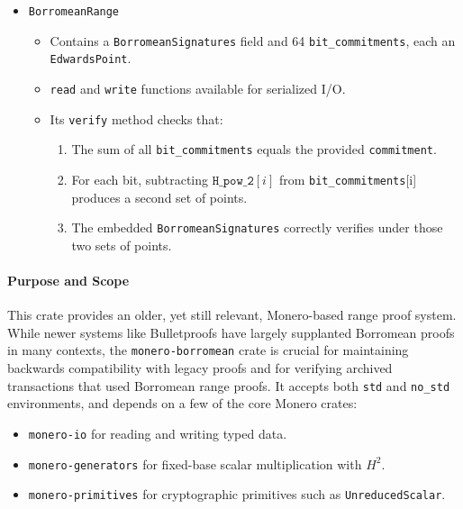 \documentclass[12pt,a4paper]{article}
\begin{document}
\begin{itemize}
  \item \texttt{BorromeanRange} %
  \begin{itemize}
    \item Contains a \texttt{BorromeanSignatures} field and 64 \texttt{bit\_commitments}, each an \texttt{EdwardsPoint}.
    \item \texttt{read} and \texttt{write} functions available for serialized I/O. %
    \item Its \texttt{verify} method checks that: %
      \begin{enumerate}[label=(\alph*)]
        \item The sum of all \texttt{bit\_commitments} equals the provided \texttt{commitment}. %
        \item For each bit, subtracting \(\texttt{H\_pow\_2}[i]\) from \texttt{bit\_commitments}[i] produces a second set of points. %
        \item The embedded \texttt{BorromeanSignatures} correctly verifies under those two sets of points. %
      \end{enumerate}
  \end{itemize}
\end{itemize}

\paragraph{Purpose and Scope}
This crate provides an older, yet still relevant, Monero-based range proof system.  While newer systems like Bulletproofs have largely supplanted Borromean proofs in many contexts, the \texttt{monero-borromean} crate is crucial for maintaining backwards compatibility with legacy proofs and for verifying archived transactions that used Borromean range proofs. It accepts both \texttt{std} and \texttt{no\_std} environments, and depends on a few of the core Monero crates:
\begin{itemize}
  \item \texttt{monero-io} for reading and writing typed data.
  \item \texttt{monero-generators} for fixed-base scalar multiplication with \(H^2\).
  \item \texttt{monero-primitives} for cryptographic primitives such as \texttt{UnreducedScalar}.
\end{itemize}
\end{document}
